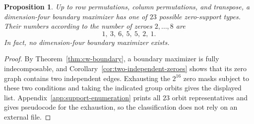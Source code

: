 \documentclass[11pt]{amsart}
\newtheorem{proposition}[theorem]{Proposition}
\theoremstyle{definition}
\theoremstyle{remark}
\begin{document}
\begin{proposition}\label{prop:dittert-n4-supports}
Up to row permutations, column permutations, and transpose, a
dimension-four boundary maximizer has one of \(23\) possible zero-support
types.  Their numbers according to the number of zeroes \(2,\ldots,8\) are
\[
 1,\ 3,\ 6,\ 5,\ 5,\ 2,\ 1.
\]
In fact, no dimension-four boundary maximizer exists.
\end{proposition}

\begin{proof}
By Theorem~\ref{thm:cw-boundary}, a boundary maximizer is fully
indecomposable, and Corollary~\ref{cor:two-independent-zeroes} shows that
its zero graph contains two independent edges.  Exhausting the \(2^{16}\)
zero masks subject to these two conditions and taking the indicated group
orbits gives the displayed list.  Appendix~\ref{app:support-enumeration}
prints all \(23\) orbit representatives and gives pseudocode for the
exhaustion, so the classification does not rely on an external file.


\end{proof}
\end{document}

